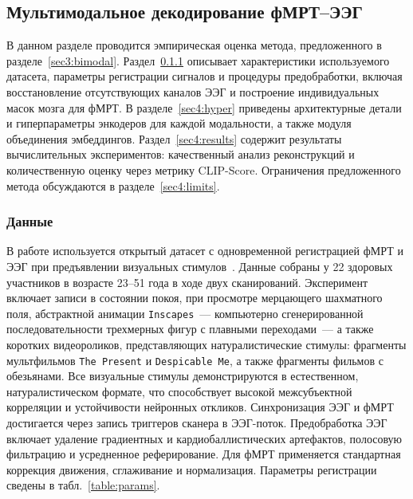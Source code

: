 \subsection{Мультимодальное декодирование фМРТ--ЭЭГ}\label{sec4:bimodal}
В данном разделе проводится эмпирическая оценка метода, предложенного в разделе~\ref{sec3:bimodal}. Раздел~\ref{sec4:data} описывает характеристики используемого датасета, параметры регистрации сигналов и процедуры предобработки, включая восстановление отсутствующих каналов ЭЭГ и построение индивидуальных масок мозга для фМРТ. В разделе~\ref{sec4:hyper} приведены архитектурные детали и гиперпараметры энкодеров для каждой модальности, а также модуля объединения эмбеддингов. Раздел~\ref{sec4:results} содержит результаты вычислительных экспериментов: качественный анализ реконструкций и количественную оценку через метрику CLIP-Score. Ограничения предложенного метода обсуждаются в разделе~\ref{sec4:limits}. 
\subsubsection{Данные}\label{sec4:data}

В работе используется открытый датасет с одновременной регистрацией фМРТ и ЭЭГ при предъявлении визуальных стимулов~\cite{Telesford2023}. Данные собраны у 22 здоровых участников в возрасте 23--51 года в ходе двух сканирований. Эксперимент включает записи в состоянии покоя, при просмотре мерцающего шахматного поля, абстрактной анимации \texttt{Inscapes}~--- компьютерно сгенерированной последовательности трехмерных фигур с плавными переходами~--- а также коротких видеороликов, представляющих натуралистические стимулы: фрагменты мультфильмов \texttt{The Present} и \texttt{\texttt{Despicable Me}}, а также фрагменты фильмов с обезьянами. Все визуальные стимулы демонстрируются в естественном, натуралистическом формате, что способствует высокой межсубъектной корреляции и устойчивости нейронных откликов. Синхронизация ЭЭГ и фМРТ достигается через запись триггеров сканера в ЭЭГ-поток. Предобработка ЭЭГ включает удаление градиентных и кардиобаллистических артефактов, полосовую фильтрацию и усредненное реферирование. Для фМРТ применяется стандартная коррекция движения, сглаживание и нормализация. Параметры регистрации сведены в табл.~\ref{table:params}.

